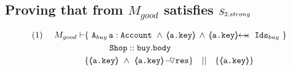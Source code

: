 \subsection{Proving that  from $M_{good}$ satisfies $S_{2,strong}$}
\label{s:buy:sat}

\begin{lemma}
\label{l:buy:sat}
 
\begin{align*}
\text{(1)}  \ \ \ \ M_{good} \vdash 
		&	\{  \ \Alocals\,\prg{a}:\prg{Account}\ \wedge\, {\inside{\prg{a.key}}} \, \wedge \, \protectedFrom {\prg{a.key}} {\Ids}  \  \} \\
		& \SPT \prg{Shop}::\prg{buy}.\prg{body}\ \\  
		& \{ {\inside{\prg{a.key}}}\ \wedge\ {\PushASLong {\prg{res}} {\inside{\prg{a.key}}}}  \} \ \ \  || \ \ \ 
		   \{ {\inside{\prg{a.key}}} \}
\end{align*}

\end{lemma}

